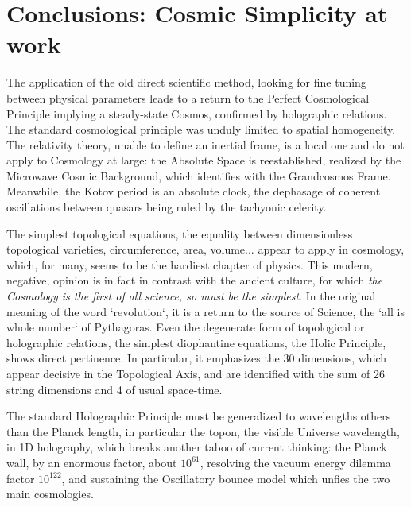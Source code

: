 \documentclass[twoside,draft]{article}
\begin{document}
\begin{sloppypar}
\section {Conclusions: Cosmic Simplicity at work}

The application of the old direct scientific method, looking for fine tuning between physical
parameters leads to a return to the Perfect Cosmological Principle implying a steady-state Cosmos,
confirmed by holographic relations. The standard cosmological principle was unduly limited to
spatial homogeneity. The relativity theory, unable to define an inertial frame, is a local one and do
not apply to Cosmology at large: the Absolute Space is reestablished, realized by the Microwave
Cosmic Background, which identifies with the Grandcosmos Frame. Meanwhile, the Kotov period is an
absolute clock, the dephasage of coherent oscillations between quasars being ruled by the tachyonic celerity.

The simplest topological equations, the equality between dimensionless topological varieties,
circumference, area, volume... appear to apply in cosmology, which, for many, seems to be the hardiest
chapter of physics. This modern, negative, opinion is in fact in contrast with the ancient culture, for
which \textit{the Cosmology is the first of all science, so must be the simplest}. In the original meaning of the
word `revolution`, it is a return to the source of Science, the `all is whole number` of Pythagoras.
Even the degenerate form of topological or holographic relations, the simplest diophantine
equations, the Holic Principle, shows direct pertinence. In particular, it emphasizes the 30
dimensions, which appear decisive in the Topological Axis, and are identified with the sum of 26 string
dimensions and 4 of usual space-time.

The standard Holographic Principle must be generalized to wavelengths others than the Planck
length, in particular the topon, the visible Universe wavelength, in 1D holography, which breaks
another taboo of current thinking: the Planck wall, by an enormous factor, about $10^{61}$, resolving the
vacuum energy dilemma factor $10^{122}$, and sustaining the Oscillatory bounce model which unfies the two main cosmologies.


\end{sloppypar}
\end{document}
